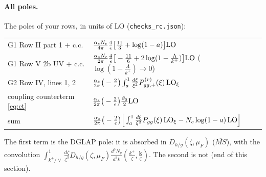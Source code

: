 \documentclass[9pt]{article}
\numberwithin{equation}{section}
\begin{document}
\paragraph{All poles.} The poles of your rows, in units of LO (\texttt{checks\_rc.json}):
\begin{center}\small
\begin{tabular}{@{}ll@{}}\hline
G1 Row II part 1 $+$ c.c. & $\frac{\alpha_sN_c}{4\pi}\frac{4}{\epsilon}\big[\frac{11}{3}+\log(1-a)\big]{\rm LO}$\\
G1 Row V 2b UV $+$ c.c. & $\frac{\alpha_sN_c}{2\pi}\frac{4}{\epsilon}\big[-\frac{11}{6}+2\log(1-\frac{\Lambda}{k^+})\big]{\rm LO}$ \quad($\log(1-\frac{\Lambda}{k^+})\to0$)\\
G2 Row IV, lines 1, 2 & $\frac{\alpha_s}{2\pi}\big(-\frac{2}{\epsilon}\big)\int_a^1\frac{d\xi}{\xi^2}P^{(r)}_{gg,+}(\xi)\,{\rm LO}_\xi$\\
coupling counterterm \eqref{eq:ct} & $\frac{\alpha_s}{2\pi}\big(-\frac{2}{\epsilon}\big)\frac{\beta_0}{2}{\rm LO}$\\\hline
sum & $\frac{\alpha_s}{2\pi}\big(-\frac{2}{\epsilon}\big)\Big[\int_a^1\frac{d\xi}{\xi^2}P_{gg}(\xi)\,{\rm LO}_\xi-N_c\log(1-a)\,{\rm LO}\Big]$\\\hline
\end{tabular}
\end{center}
The first term is the DGLAP pole: it is absorbed in $D_{h/g}(\zeta,\mu_F)$ ($\overline{MS}$), with the convolution $\int_{k^+/\vee}^1\frac{d\zeta}{\zeta^3}D_{h/g}(\zeta,\mu_F)\frac{d^3N_g}{d^3k}(\frac{k^+}{\zeta},\frac{\mathbf k}{\zeta})$. The second is not (end of this section).
\end{document}
